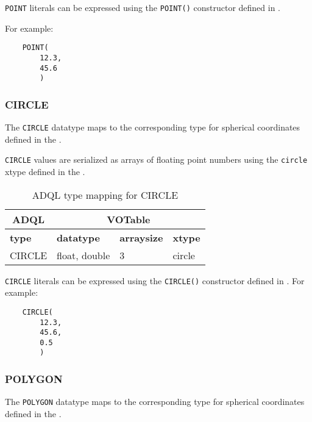 \documentclass[11pt,a4paper]{ivoa}
\begin{document}
\verb:POINT: literals can be expressed using the \verb:POINT():
constructor defined in .

For example:
\begin{verbatim}
    POINT(
        12.3,
        45.6
        )
\end{verbatim}

\subsubsection{CIRCLE}
\label{sec:types.geom.circle}

The \verb:CIRCLE: datatype maps to the corresponding type
for spherical coordinates defined in the
\DALISpec{}.

\verb:CIRCLE: values are serialized as arrays of floating point numbers
using the \verb:circle: xtype defined in the \DALISpec{}.

\begin{table}[th]\footnotesize
    \begin{tabular}
        {|p{}|p{}|p{}|p{}|}

        \hline
        \multicolumn{1}{|c|}{\textbf{ADQL}} &
        \multicolumn{3}{|c|}{\textbf{VOTable}}
        \tabularnewline

        \hline
        \textbf{type} &
        \textbf{datatype} &
        \textbf{arraysize} &
        \textbf{xtype}
        \tabularnewline

        \hline
        CIRCLE &
        float, double &
        3 &
        circle
        \tabularnewline
        \hline
    \end{tabular}
    \caption{ADQL type mapping for CIRCLE}
    \label{table:types.geom.circle}
\end{table}

\verb:CIRCLE: literals can be expressed using the \verb:CIRCLE():
constructor defined in .
For example:
\begin{verbatim}
    CIRCLE(
        12.3,
        45.6,
        0.5
        )
\end{verbatim}

\subsubsection{POLYGON}
\label{sec:types.geom.polygon}

The \verb:POLYGON: datatype maps to the corresponding type
for spherical coordinates defined in the
\DALISpec{}.
\end{document}
